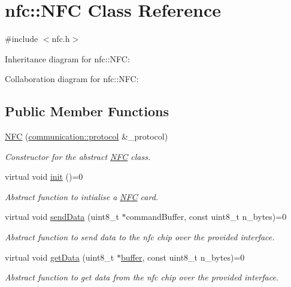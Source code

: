 \hypertarget{classnfc_1_1NFC}{}\section{nfc\+:\+:N\+FC Class Reference}
\label{classnfc_1_1NFC}


{\ttfamily \#include $<$nfc.\+h$>$}



Inheritance diagram for nfc\+:\+:N\+FC\+:


Collaboration diagram for nfc\+:\+:N\+FC\+:
\subsection*{Public Member Functions}
\begin{DoxyCompactItemize}
\item 
\hyperlink{classnfc_1_1NFC_a6ebeb8952cb8be604ef33d4188f86303}{N\+FC} (\hyperlink{classcommunication_1_1protocol}{communication\+::protocol} \&\+\_\+protocol)
\begin{DoxyCompactList}\small\item\em Constructor for the abstract \hyperlink{classnfc_1_1NFC}{N\+FC} class. \end{DoxyCompactList}\item 
virtual void \hyperlink{classnfc_1_1NFC_a9893c1b762ed0c6796afcde7733bd8cc}{init} ()=0
\begin{DoxyCompactList}\small\item\em Abstract function to intialise a \hyperlink{classnfc_1_1NFC}{N\+FC} card. \end{DoxyCompactList}\item 
virtual void \hyperlink{classnfc_1_1NFC_af8fe01b21da65e4e8334f802073168ab}{send\+Data} (uint8\+\_\+t $\ast$command\+Buffer, const uint8\+\_\+t n\+\_\+bytes)=0
\begin{DoxyCompactList}\small\item\em Abstract function to send data to the nfc chip over the provided interface. \end{DoxyCompactList}\item 
virtual void \hyperlink{classnfc_1_1NFC_a3458fc807a5f0d485099a1e5f54bcbb5}{get\+Data} (uint8\+\_\+t $\ast$\hyperlink{classbuffer}{buffer}, const uint8\+\_\+t n\+\_\+bytes)=0
\begin{DoxyCompactList}\small\item\em Abstract function to get data from the nfc chip over the provided interface. \end{DoxyCompactList}\item 

\end{DoxyCompactItemize}
